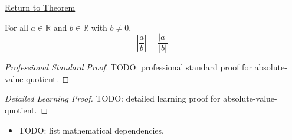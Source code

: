 \newpage
{}
\label{prf:absolute-value-quotient}

\begin{remark*}[Return]
\hyperref[thm:absolute-value-quotient]{Return to Theorem}
\end{remark*}

\begin{theorem*}
For all $a \in \mathbb{R}$ and $b \in \mathbb{R}$ with $b \ne 0$,
\[
  \left\lvert \frac{a}{b} \right\rvert
  = \frac{\lvert a \rvert}{\lvert b \rvert}.
\]
\end{theorem*}

\begin{proof}[Professional Standard Proof]
\LRAProofBodyStart
TODO: professional standard proof for absolute-value-quotient.
\end{proof}

\begin{proof}[Detailed Learning Proof]
\LRAProofBodyStart
TODO: detailed learning proof for absolute-value-quotient.
\end{proof}

\begin{remark*}
\end{remark*}

\begin{dependencies}
\begin{itemize}
  \item TODO: list mathematical dependencies.
\end{itemize}
\end{dependencies}

\clearpage
